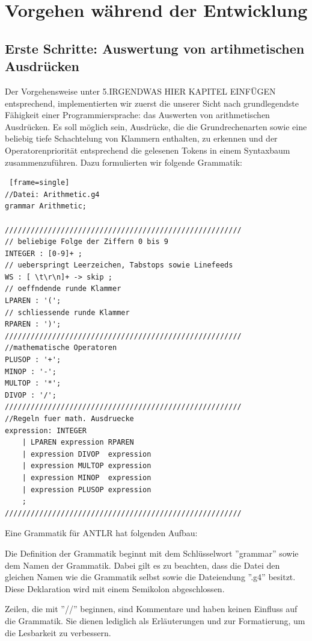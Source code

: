 
\section{Vorgehen während der Entwicklung}
\subsection{Erste Schritte: Auswertung von artihmetischen Ausdrücken}
Der Vorgehensweise unter 5.IRGENDWAS HIER KAPITEL EINFÜGEN entsprechend, implementierten wir zuerst die unserer Sicht nach grundlegendste Fähigkeit einer Programmiersprache: das Auswerten von arithmetischen Ausdrücken. Es soll möglich sein, Ausdrücke, die die Grundrechenarten sowie eine beliebig tiefe Schachtelung von Klammern enthalten, zu erkennen und der Operatorenpriorität entsprechend die gelesenen Tokens in einem Syntaxbaum zusammenzuführen. Dazu formulierten wir folgende Grammatik:


\begin{lstlisting} [frame=single] 
//Datei: Arithmetic.g4
grammar Arithmetic;

///////////////////////////////////////////////////////
// beliebige Folge der Ziffern 0 bis 9
INTEGER : [0-9]+ ;        
// ueberspringt Leerzeichen, Tabstops sowie Linefeeds
WS : [ \t\r\n]+ -> skip ; 
// oeffndende runde Klammer
LPAREN : '(';		  	  
// schliessende runde Klammer
RPAREN : ')';		  	  
///////////////////////////////////////////////////////
//mathematische Operatoren
PLUSOP : '+';
MINOP : '-';
MULTOP : '*';
DIVOP : '/';
///////////////////////////////////////////////////////
//Regeln fuer math. Ausdruecke
expression: INTEGER					
	| LPAREN expression RPAREN		
	| expression DIVOP  expression  
	| expression MULTOP expression	
	| expression MINOP  expression 
	| expression PLUSOP expression 
	;			
///////////////////////////////////////////////////////

\end{lstlisting}

Eine Grammatik für ANTLR hat folgenden Aufbau:

Die Definition der Grammatik beginnt mit dem Schlüsselwort ''grammar'' sowie dem Namen der Grammatik. Dabei gilt es zu beachten, dass die Datei den gleichen Namen wie die Grammatik selbst sowie die Dateiendung ''.g4'' besitzt. Diese Deklaration wird mit einem Semikolon abgeschlossen.

Zeilen, die mit ''//'' beginnen, sind Kommentare und haben keinen Einfluss auf die Grammatik. Sie dienen lediglich als Erläuterungen und zur Formatierung, um die Lesbarkeit zu verbessern.

